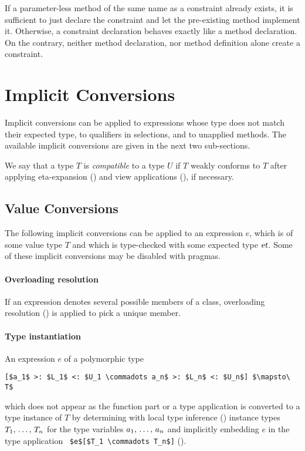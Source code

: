 If a parameter-less method of the same name as a constraint already exists, it is sufficient to just declare the constraint and let the pre-existing method implement it. Otherwise, a constraint declaration behaves exactly like a method declaration. On the contrary, neither method declaration, nor method definition alone create a constraint. 






\section{Implicit Conversions}
\label{sec:implicit-conversions}

Implicit conversions can be applied to expressions whose type does not match their expected type, to qualifiers in selections, and to unapplied methods. The available implicit conversions are given in the next two sub-sections.

We say that a type $T$ is {\em compatible} to a type $U$ if $T$ weakly conforms to $T$ after applying eta-expansion () and view applications (), if necessary.






\subsection{Value Conversions}
\label{sec:value-conversions}

The following implicit conversions can be applied to an expression $e$, which is of some value type $T$ and which is type-checked with some expected type $\mbox{\sl et}$. Some of these implicit conversions may be disabled with pragmas.

\paragraph{Overloading resolution}
If an expression denotes several possible members of a class, overloading resolution () is applied to pick a unique member. 

\paragraph{Type instantiation}
An expression $e$ of a polymorphic type
\begin{lstlisting}
[$a_1$ >: $L_1$ <: $U_1 \commadots a_n$ >: $L_n$ <: $U_n$] $\mapsto\ T$
\end{lstlisting}
which does not appear as the function part or a type application is converted to a type instance of $T$ by determining with local type inference () instance types $T_1 ,\, \ldots ,\, T_n$ for the type variables $a_1 ,\, \ldots ,\, a_n$ and implicitly embedding $e$ in the type application ~\lstinline!$e$[$T_1 \commadots T_n$]! (). 

